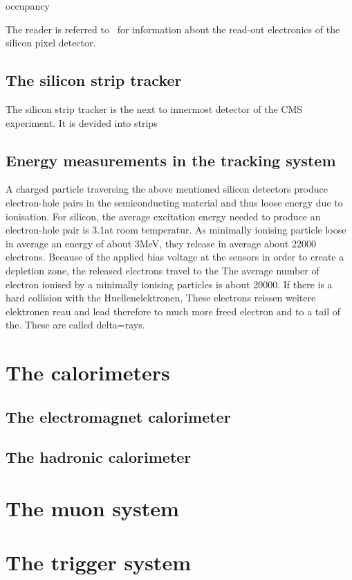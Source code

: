 occupancy

The reader is referred to~\cite{FIXME} for information about the read-out electronics of the silicon pixel detector.
\subsection*{The silicon strip tracker}
The silicon strip tracker is the next to innermost detector of the CMS experiment.
It is devided into strips

\subsection*{Energy measurements in the tracking system}
A charged particle traversing the above mentioned silicon detectors produce electron-hole pairs in the semiconducting material and thus loose energy due to ionisation.
For silicon, the average excitation energy needed to produce an electron-hole pair is 3.1\ev at room temperatur.
As minimally ionising particle loose in average an energy of about 3MeV, they release in average about 22000 electrons.
Because of the applied bias voltage at the sensors in order to create a depletion zone, the released electrons travel to the 
The average number of electron ionised by a minimally ionising particles is about 20000.
If there is a hard collision with the Huellenelektronen, These electrons reissen weitere elektronen reau and lead therefore to much more freed electron and to a tail of the. These are called delta=rays.


\section{The calorimeters}
\subsection*{The electromagnet calorimeter}
\subsection*{The hadronic calorimeter}

\section{The muon system}

\section{The trigger system}

